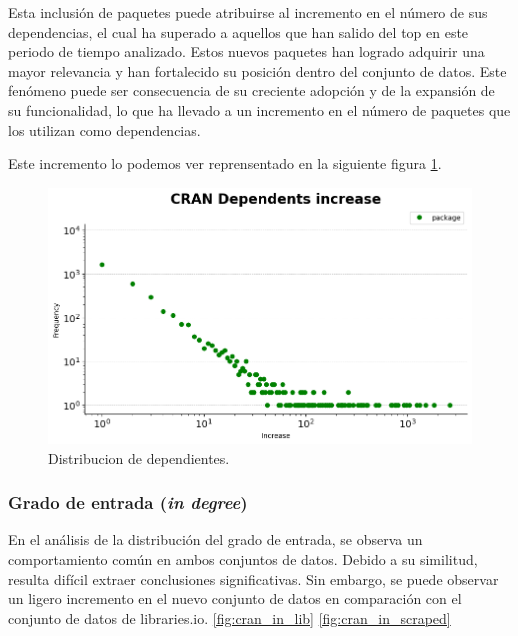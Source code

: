 Esta inclusión de paquetes puede atribuirse al incremento en el número de sus dependencias,
el cual ha superado a aquellos que han salido del top en este periodo de tiempo analizado.
Estos nuevos paquetes han logrado adquirir una mayor relevancia y han fortalecido su posición
dentro del conjunto de datos. Este fenómeno puede ser consecuencia de su creciente adopción y
de la expansión de su funcionalidad, lo que ha llevado a un incremento en el número de paquetes
que los utilizan como dependencias.

Este incremento lo podemos ver reprensentado en la siguiente figura \ref{fig:cran_dependents_dist}.

\begin{figure}[ht!]
    \begin{center}
        \includegraphics[width=1\textwidth]{img/cran/dependents_dist.png}
        \caption{Distribucion de dependientes.}
        \label{fig:cran_dependents_dist}
    \end{center}
\end{figure}

\subsubsection{Grado de entrada (\textit{in degree})}


En el análisis de la distribución del grado de entrada, se observa un comportamiento común
en ambos conjuntos de datos. Debido a su similitud, resulta difícil extraer conclusiones
significativas. Sin embargo, se puede observar un ligero incremento en el nuevo conjunto de
datos en comparación con el conjunto de datos de libraries.io. \ref{fig:cran_in_lib} \ref{fig:cran_in_scraped}

